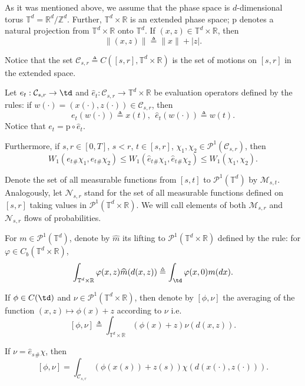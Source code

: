 \documentclass[a4paper,12pt]{article}
\newcommand{\tdr}{\mathbb{T}^{d}\times\mathbb{R}}
\newcommand{\ptd}{\mathcal{P}^1(\mathbb{T}^d)}
\newcommand{\pc}[2]{\mathcal{P}^1(\mathcal{C}_{#1,#2})}
\begin{document}
As it was mentioned above, we assume that the phase space is $d$-dimensional torus   $\mathbb{T}^d=\mathbb{R}^d/\mathbb{Z}^d$.  Further, $\mathbb{T}^d\times\mathbb{R}$ is an extended phase space; $\mathrm{p}$ denotes a natural projection from $\mathbb{T}^d\times\mathbb{R}$ onto $\mathbb{T}^d$. 
If $(x,z)\in \mathbb{T}^d\times\mathbb{R}$, then
$$\|(x,z)\|\triangleq \|x\|+|z|.$$ 



Notice that the set $\mathcal{C}_{s,r}\triangleq C([s,r],\tdr)$ is the set of motions on $[s,r]$ in the extended space. 

Let $e_t:\mathcal{C}_{s,r}\rightarrow \td$ and $\hat{e}_t:\mathcal{C}_{s,r}\rightarrow \tdr$ be evaluation operators defined by the rules: if $w(\cdot)=(x(\cdot),z(\cdot))\in\mathcal{C}_{s,r}$, then \begin{equation}\label{intro:evaluation_operators}
e_t(w(\cdot))\triangleq x(t),\ \ \hat{e}_t(w(\cdot))\triangleq w(t).
\end{equation} Notice  that $e_t=\mathrm{p}\circ \hat{e}_t$.

Furthermore, if $s,r\in [0,T]$, $s<r$, $t\in [s,r]$, $\chi_1,\chi_2\in\pc{s}{r}$, then
\begin{equation}\label{ineq:Wasserstein_e_t}
W_1(e_t{}_\#\chi_1,e_t{}_\#\chi_2)\leq W_1(\hat{e}_t{}_\#\chi_1,\hat{e}_t{}_\#\chi_2)\leq W_1(\chi_1,\chi_2).
\end{equation}

Denote the set of all measurable functions from  $[s,t]$ to $\ptd$ by $\mathcal{M}_{s,t}$. Analogously, let $\mathcal{N}_{s,r}$ stand for the set of all measurable functions defined on $[s,r]$ taking values in $\mathcal{P}^1(\tdr)$. We will call elements of both $\mathcal{M}_{s,r}$ and $\mathcal{N}_{s,r}$ flows of probabilities. 

For $m\in\ptd$,  denote by $\widehat{m}$ its lifting to $\mathcal{P}^1(\tdr)$ defined by the rule: for $\varphi\in C_b(\tdr)$,
\begin{equation}\label{intro:lifting_m}
\int_{\tdr}\varphi(x,z)\widehat{m}(d(x,z))\triangleq \int_{\td}\varphi(x,0)m(dx).
\end{equation}

If $\phi\in C(\td)$ and $\nu\in \mathcal{P}^1(\tdr)$, then denote by $[\phi,\nu]$ the averaging of the function $(x,z)\mapsto \phi(x)+z$ according to $\nu$ i.e.
\begin{equation}\label{intro:action}
[\phi,\nu]\triangleq \int_{\tdr}(\phi(x)+z)\nu(d(x,z)).
\end{equation} 
\begin{remark}\label{remark:formula}
	If $\nu=\hat{e}_s{}_\#\chi$, then
	$$[\phi,\nu]=\int_{\mathcal{C}_{s,r}}(\phi(x(s))+z(s))\chi(d(x(\cdot),z(\cdot))). $$
\end{remark}
\end{document}
